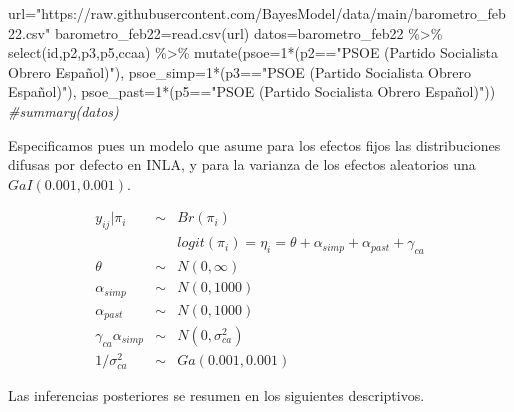 \documentclass[
]{book}
\newenvironment{Shaded}{\begin{snugshade}}{\end{snugshade}}
\newcommand{\AttributeTok}[1]{\textcolor[rgb]{0.77,0.63,0.00}{#1}}
\newcommand{\CommentTok}[1]{\textcolor[rgb]{0.56,0.35,0.01}{\textit{#1}}}
\newcommand{\DecValTok}[1]{\textcolor[rgb]{0.00,0.00,0.81}{#1}}
\newcommand{\FunctionTok}[1]{\textcolor[rgb]{0.00,0.00,0.00}{#1}}
\newcommand{\NormalTok}[1]{#1}
\newcommand{\OtherTok}[1]{\textcolor[rgb]{0.56,0.35,0.01}{#1}}
\newcommand{\SpecialCharTok}[1]{\textcolor[rgb]{0.00,0.00,0.00}{#1}}
\newcommand{\StringTok}[1]{\textcolor[rgb]{0.31,0.60,0.02}{#1}}
\begin{document}
\begin{Shaded}
\begin{Highlighting}[]
\NormalTok{url}\OtherTok{=}\StringTok{"https://raw.githubusercontent.com/BayesModel/data/main/barometro\_feb22.csv"}
\NormalTok{barometro\_feb22}\OtherTok{=}\FunctionTok{read.csv}\NormalTok{(url)}
\NormalTok{datos}\OtherTok{=}\NormalTok{barometro\_feb22 }\SpecialCharTok{\%\textgreater{}\%}
  \FunctionTok{select}\NormalTok{(id,p2,p3,p5,ccaa) }\SpecialCharTok{\%\textgreater{}\%}
  \FunctionTok{mutate}\NormalTok{(}\AttributeTok{psoe=}\DecValTok{1}\SpecialCharTok{*}\NormalTok{(p2}\SpecialCharTok{==}\StringTok{"PSOE (Partido Socialista Obrero Español)"}\NormalTok{),}
         \AttributeTok{psoe\_simp=}\DecValTok{1}\SpecialCharTok{*}\NormalTok{(p3}\SpecialCharTok{==}\StringTok{"PSOE (Partido Socialista Obrero Español)"}\NormalTok{),}
         \AttributeTok{psoe\_past=}\DecValTok{1}\SpecialCharTok{*}\NormalTok{(p5}\SpecialCharTok{==}\StringTok{"PSOE (Partido Socialista Obrero Español)"}\NormalTok{)) }
\CommentTok{\#summary(datos)}
\end{Highlighting}
\end{Shaded}

Especificamos pues un modelo que asume para los efectos fijos las distribuciones difusas por defecto en INLA, y para la varianza de los efectos aleatorios una \(GaI(0.001,0.001)\).

\begin{eqnarray*}
y_{ij}|\pi_i & \sim & Br(\pi_i) \\
&& logit(\pi_i)=\eta_i=\theta + \alpha_{simp} + \alpha_{past} + \gamma_{ca} \\
\theta &\sim& N(0,\infty) \\
\alpha_{simp}&\sim& N(0,1000) \\
\alpha_{past}&\sim& N(0,1000) \\
\gamma_{ca}\alpha_{simp}&\sim& N(0,\sigma_{ca}^2) \\
1/\sigma_{ca}^2  &\sim& Ga(0.001,0.001)
\end{eqnarray*}

Las inferencias posteriores se resumen en los siguientes descriptivos.
\end{document}
